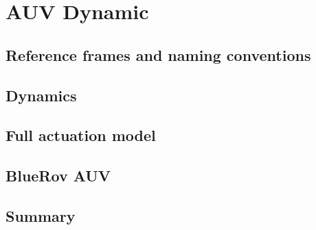 \chapter{AUV Dynamic}
\label{chap:second}
\ifpdf
    \graphicspath{{Chapter2/Figures/PNG/}{Chapter2/Figures/PDF/}{Chapter2/Figures/}{Chapter2/Figures/EPS/}}
\else
    \graphicspath{{Chapter2/Figures/EPS/}{Chapter2/Figures/}}
\fi
\section{Reference frames and naming conventions}

\section{Dynamics}

\section{Full actuation model}

\section{BlueRov AUV}

\section{Summary}



